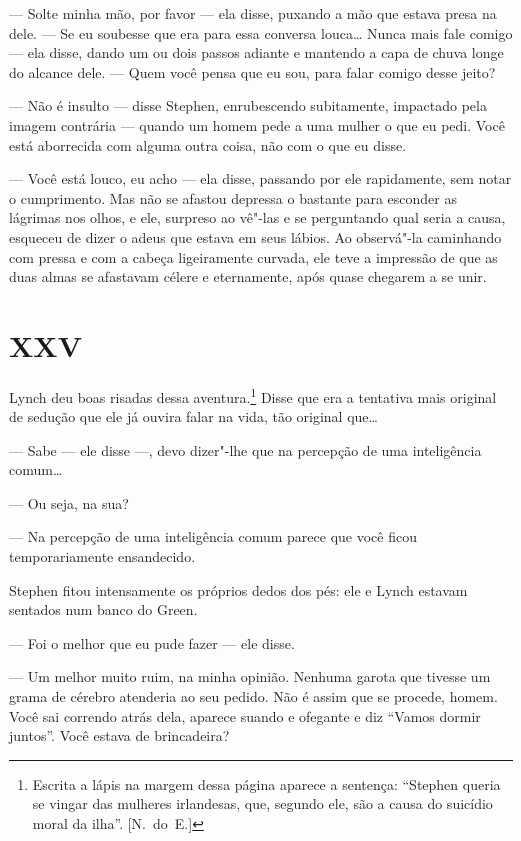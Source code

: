 --- Solte minha mão, por favor --- ela disse, puxando a mão que estava presa na
dele.  --- Se eu soubesse que era para essa conversa louca\ldots{}  Nunca mais fale
comigo --- ela disse, dando um ou dois passos adiante e mantendo a capa de
chuva longe do alcance dele.  --- Quem você pensa que eu sou, para falar comigo
desse jeito?

--- Não é insulto --- disse Stephen, enrubescendo subitamente, impactado pela
imagem contrária --- quando um homem pede a uma mulher o que eu pedi.  Você
está aborrecida com alguma outra coisa, não com o que eu disse.

--- Você está louco, eu acho --- ela disse, passando por ele rapidamente, sem
notar o cumprimento.  Mas não se afastou depressa o bastante para esconder as
lágrimas nos olhos, e ele, surpreso ao vê"-las e se perguntando qual seria a
causa, esqueceu de dizer o adeus que estava em seus lábios.  Ao observá"-la
caminhando com pressa e com a cabeça ligeiramente curvada, ele teve a impressão
de que as duas almas se afastavam célere e eternamente, após quase chegarem a
se unir.

\section{XXV}

Lynch deu boas risadas dessa aventura.\footnote{ Escrita a lápis na
margem dessa página aparece a sentença: “Stephen queria se vingar das
mulheres irlandesas, que, segundo ele, são a causa do suicídio moral da
ilha”. [N.~do~E.]}  Disse que era a tentativa mais original de sedução
que ele já ouvira falar na vida, tão original que\ldots{}

--- Sabe --- ele disse ---, devo dizer"-lhe que na percepção de uma
inteligência comum\ldots{}

--- Ou seja, na sua?

--- Na percepção de uma inteligência comum parece que você ficou
temporariamente ensandecido.

Stephen fitou intensamente os próprios dedos dos pés: ele e Lynch
estavam sentados num banco do Green.

--- Foi o melhor que eu pude fazer --- ele disse.

--- Um melhor muito ruim, na minha opinião.  Nenhuma garota que
tivesse um grama de cérebro atenderia ao seu pedido.  Não é assim que
se procede, homem.  Você sai correndo atrás dela, aparece suando e
ofegante e diz “Vamos dormir juntos”.  Você estava de brincadeira?

